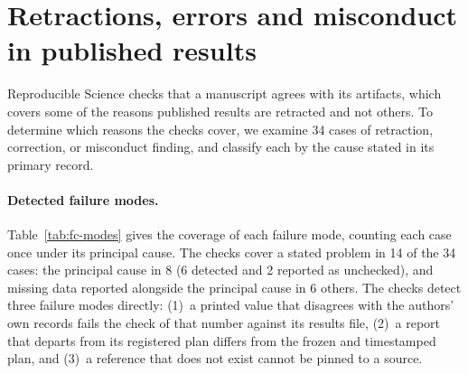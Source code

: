 
\section{Retractions, errors and misconduct in published results}
\label{sec:failure-cases}

Reproducible Science checks that a manuscript agrees with its artifacts, which covers some of the
reasons published results are retracted and not others. To determine which reasons the checks
cover, we examine 34 cases of retraction, correction, or misconduct finding, and classify each
by the cause stated in its primary record.

\paragraph{Detected failure modes.} Table~\ref{tab:fc-modes} gives the coverage of
each failure mode, counting each case once under its principal cause. The checks
cover a stated problem in 14 of the 34 cases: the principal cause in 8 (6 detected and 2
reported as unchecked), and missing data reported
alongside the principal cause in 6 others. The checks detect three failure modes directly: (1)~a printed value that
disagrees with the authors' own records fails the check of that number against its results
file, (2)~a report that departs from its registered plan differs from the frozen and
timestamped plan, and (3)~a reference that does not exist cannot be pinned to a source.

